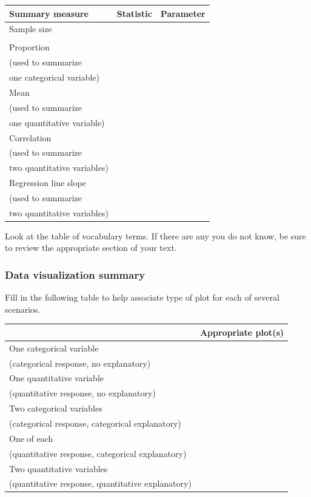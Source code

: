 \documentclass[
]{report}
\newcommand{\rgs}{\vspace{12pt}} %
\begin{document}
\begin{center}
\begin{tabular}{|l|p{2in}|p{2in}|}\hline
Summary measure & Statistic & Parameter \\ \hline
Sample size & & \\ 
& & \\ \hline
Proportion & & \\ 
(used to summarize & & \\ 
one categorical variable) & & \\ \hline
Mean & & \\ 
(used to summarize & & \\ 
one quantitative variable)& & \\ \hline
Correlation & & \\ 
(used to summarize & & \\ 
two quantitative variables)& & \\ \hline
Regression line slope & & \\ 
(used to summarize & & \\ 
two quantitative variables)& & \\ \hline
\end{tabular}
\end{center}

\rgs

Look at the table of vocabulary terms. If there are any you do not know, be sure to review the appropriate section of your text.

\hypertarget{data-visualization-summary}{%
\subsubsection*{Data visualization summary}\label{data-visualization-summary}}

Fill in the following table to help associate type of plot for each of several scenarios.

\begin{center}
\begin{tabular}{|l|p{3in}|} \hline
 & Appropriate plot(s) \\ \hline
One categorical variable & \\
(categorical response, no explanatory) & \\ \hline
One quantitative variable  & \\
(quantitative response, no explanatory) & \\ \hline
Two categorical variables  & \\
(categorical response, categorical explanatory) & \\ \hline
One of each  & \\
(quantitative response, categorical explanatory) & \\ \hline
Two quantitative variables  & \\
(quantitative response, quantitative explanatory) & \\ \hline
\end{tabular}
\end{center}
\end{document}
